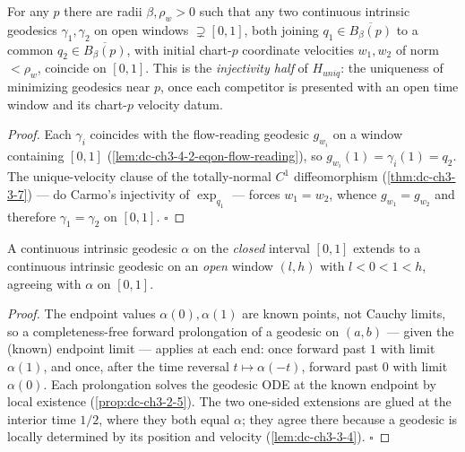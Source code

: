 \begin{lemma}
  \label{lem:dc-ch3-4-2-uniqueness-engine}
  \leanok
  For any $p$ there are radii $\beta,\rho_w>0$ such that any two continuous intrinsic geodesics
  $\gamma_1,\gamma_2$ on open windows $\supsetneq[0,1]$, both joining $q_1\in\overline{B_\beta(p)}$ to
  a common $q_2\in\overline{B_\beta(p)}$, with initial chart-$p$ coordinate velocities $w_1,w_2$ of
  norm $<\rho_w$, coincide on $[0,1]$. This is the \emph{injectivity half} of $H_{uniq}$: the
  uniqueness of minimizing geodesics near $p$, once each competitor is presented with an open time
  window and its chart-$p$ velocity datum.
\end{lemma}
\begin{proof}
  \leanok
  Each $\gamma_i$ coincides with the flow-reading geodesic $g_{w_i}$ on a window containing $[0,1]$
  (\cref{lem:dc-ch3-4-2-eqon-flow-reading}), so $g_{w_i}(1)=\gamma_i(1)=q_2$. The unique-velocity
  clause of the totally-normal $C^1$ diffeomorphism (\cref{thm:dc-ch3-3-7}) --- do Carmo's injectivity
  of $\exp_{q_1}$ --- forces $w_1=w_2$, whence $g_{w_1}=g_{w_2}$ and therefore $\gamma_1=\gamma_2$ on
  $[0,1]$. $\square$
\end{proof}

\begin{lemma}
  \label{lem:dc-ch3-4-2-window}
  \leanok
  A continuous intrinsic geodesic $\alpha$ on the \emph{closed} interval $[0,1]$ extends to a
  continuous intrinsic geodesic on an \emph{open} window $(l,h)$ with $l<0<1<h$, agreeing with
  $\alpha$ on $[0,1]$.
\end{lemma}
\begin{proof}
  \leanok
  The endpoint values $\alpha(0),\alpha(1)$ are known points, not Cauchy limits, so a
  completeness-free forward prolongation of a geodesic on $(a,b)$ --- given the (known) endpoint
  limit --- applies at each end: once forward past $1$ with limit $\alpha(1)$, and once, after the
  time reversal $t\mapsto\alpha(-t)$, forward past $0$ with limit $\alpha(0)$. Each prolongation
  solves the geodesic ODE at the known endpoint by local existence (\cref{prop:dc-ch3-2-5}). The two
  one-sided extensions are glued at the interior time $1/2$, where they both equal $\alpha$; they
  agree there because a geodesic is locally determined by its position and velocity
  (\cref{lem:dc-ch3-3-4}). $\square$
\end{proof}

